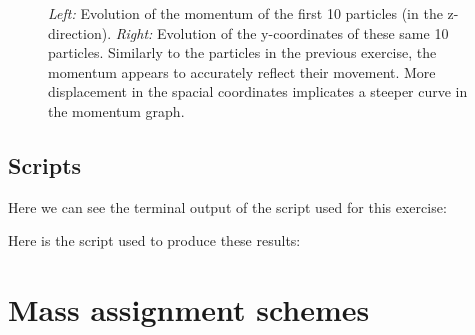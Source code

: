 \documentclass[a4paper,10pt]{article}
\begin{document}
\begin{figure}[h!] 
	\begin{center}
	\end{center}
	\captionsetup{width=0.8\linewidth}
	\vspace*{-7mm} %
	\caption{\textit{Left:} Evolution of the momentum of the first 10 particles (in the z-direction).  \textit{Right:} Evolution of the y-coordinates of these same 10 particles. Similarly to the particles in the previous exercise, the momentum appears to accurately reflect their movement. More displacement in the spacial coordinates implicates a steeper curve in the momentum graph.}
	\label{fig:4ab}
\end{figure}

\subsection{Scripts}

Here we can see the terminal output of the script used for this exercise:


Here is the script used to produce these results: 



\section{Mass assignment schemes}
\end{document}
